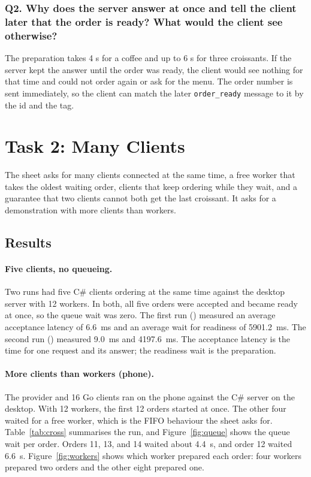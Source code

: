 \documentclass[12pt,a4paper]{article}
\begin{document}
    \subsubsection{Q2. Why does the server answer at once and tell the client later that the order is ready? What would the client see otherwise?}
    The preparation takes 4 s for a coffee and up to 6 s for three croissants. If the
    server kept the answer until the order was ready, the client would see nothing for
    that time and could not order again or ask for the menu. The order number is sent
    immediately, so the client can match the later \texttt{order\_ready} message to it
    by the id and the tag.

\section{Task 2: Many Clients}
\label{sec:task2}

The sheet asks for many clients connected at the same time, a free worker that
takes the oldest waiting order, clients that keep ordering while they wait, and a
guarantee that two clients cannot both get the last croissant. It asks for a
demonstration with more clients than workers.

\subsection{Results}

\paragraph{Five clients, no queueing.} Two runs had five C\# clients ordering at the
same time against the desktop server with 12 workers. In both, all five orders were
accepted and became ready at once, so the queue wait was zero. The first run
() measured an average
acceptance latency of 6.6~ms and an average wait for readiness of 5901.2~ms. The
second run () measured
9.0~ms and 4197.6~ms. The acceptance latency is the time for one request and its
answer; the readiness wait is the preparation.

\paragraph{More clients than workers (phone).} The provider and 16 Go clients ran
on the phone against the C\# server on the desktop. With 12 workers, the first 12
orders started at once. The other four waited for a free worker, which is the FIFO
behaviour the sheet asks for. Table~\ref{tab:cross} summarises the run, and
Figure~\ref{fig:queue} shows the queue wait per order. Orders 11, 13, and 14 waited
about 4.4~s, and order 12 waited 6.6~s. Figure~\ref{fig:workers} shows which worker
prepared each order: four workers prepared two orders and the other eight prepared
one.
\end{document}
